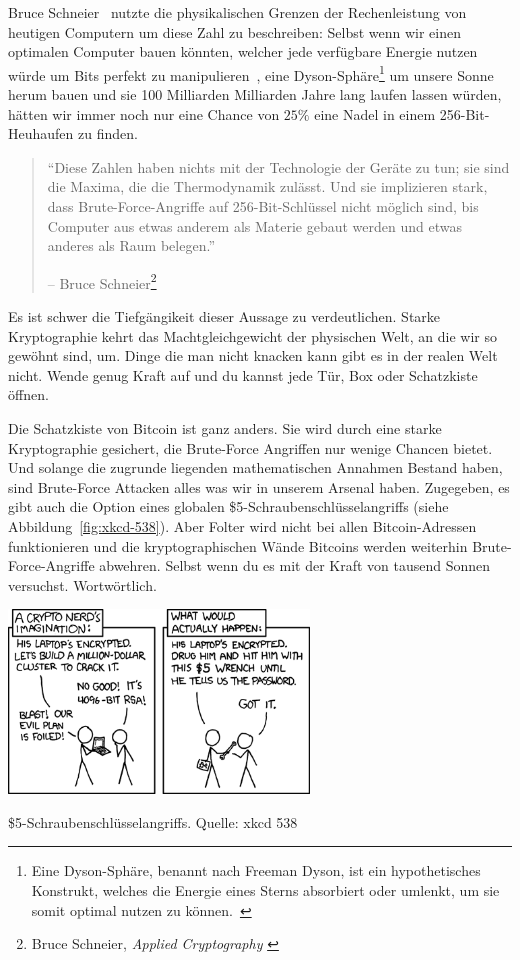 Bruce Schneier~\cite{web:schneier} nutzte die physikalischen Grenzen der
Rechenleistung von heutigen Computern um diese Zahl zu beschreiben: Selbst wenn
wir einen optimalen Computer bauen könnten, welcher jede verfügbare Energie
nutzen würde um Bits perfekt zu manipulieren~\cite{wiki:landauer}, eine
Dyson-Sphäre\footnote{Eine Dyson-Sphäre, benannt nach Freeman Dyson, ist ein
hypothetisches Konstrukt, welches die Energie eines Sterns absorbiert oder
umlenkt, um sie somit optimal nutzen zu können.~\cite{wiki:dyson}} um unsere
Sonne herum bauen und sie 100 Milliarden Milliarden Jahre lang laufen lassen
würden, hätten wir immer noch nur eine Chance von $25\%$ eine Nadel in einem
256-Bit-Heuhaufen zu finden.

\begin{quotation}\begin{samepage}
\enquote{Diese Zahlen haben nichts mit der Technologie der Geräte zu tun; sie
sind die Maxima, die die Thermodynamik zulässt. Und sie implizieren stark, dass
Brute-Force-Angriffe auf 256-Bit-Schlüssel nicht möglich sind, bis Computer aus
etwas anderem als Materie gebaut werden und etwas anderes als Raum belegen.}
\begin{flushright} -- Bruce Schneier\footnote{Bruce Schneier, \textit{Applied Cryptography} \cite{bruce-schneier}}
\end{flushright}\end{samepage}\end{quotation}

Es ist schwer die Tiefgängikeit dieser Aussage zu verdeutlichen. Starke
Kryptographie kehrt das Machtgleichgewicht der physischen Welt, an die wir so
gewöhnt sind, um. Dinge die man nicht knacken kann gibt es in der realen Welt
nicht. Wende genug Kraft auf und du kannst jede Tür, Box oder Schatzkiste
öffnen.

Die Schatzkiste von Bitcoin ist ganz anders. Sie wird durch eine starke
Kryptographie gesichert, die Brute-Force Angriffen nur wenige Chancen bietet.
Und solange die zugrunde liegenden mathematischen Annahmen Bestand haben, sind
Brute-Force Attacken alles was wir in unserem Arsenal haben. Zugegeben, es gibt
auch die Option eines globalen \$5-Schraubenschlüsselangriffs (siehe
Abbildung~\ref{fig:xkcd-538}). Aber Folter wird nicht bei allen Bitcoin-Adressen
funktionieren und die kryptographischen Wände Bitcoins werden weiterhin
Brute-Force-Angriffe abwehren. Selbst wenn du es mit der Kraft von tausend
Sonnen versuchst. Wortwörtlich.

\begin{center}
  \centering
  \includegraphics[width=8cm]{assets/images/xkcd-538.png}
  \caption{\$5-Schraubenschlüsselangriffs. Quelle: xkcd 538}
  \label{fig:xkcd-538}
\end{center}

